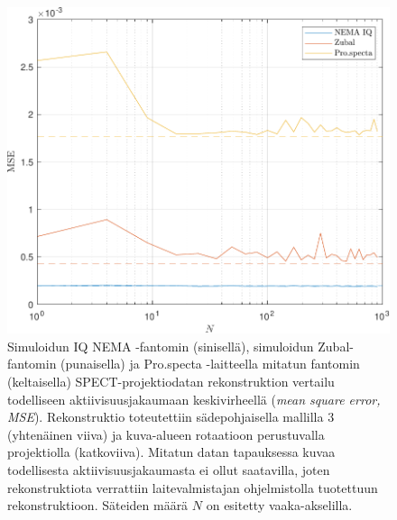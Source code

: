 \begin{figure}[H]
    \centering
    \captionsetup{width=.9\linewidth}
    \includegraphics[width=.9\linewidth]{kuvat/vertailu_MSE.pdf}
    \caption{Simuloidun IQ NEMA -fantomin (sinisellä), simuloidun Zubal-fantomin (punaisella) ja Pro.specta -laitteella mitatun fantomin (keltaisella) SPECT-projektiodatan rekonstruktion vertailu todelliseen aktiivisuusjakaumaan keskivirheellä (\textit{mean square error, MSE}). Rekonstruktio toteutettiin sädepohjaisella mallilla 3 (yhtenäinen viiva) ja kuva-alueen rotaatioon perustuvalla projektiolla (katkoviiva). Mitatun datan tapauksessa kuvaa todellisesta aktiivisuusjakaumasta ei ollut saatavilla, joten rekonstruktiota verrattiin laitevalmistajan ohjelmistolla tuotettuun rekonstruktioon.  Säteiden määrä $N$ on esitetty vaaka-akselilla.}
    \label{fig:vertailu_MSE}
\end{figure}

